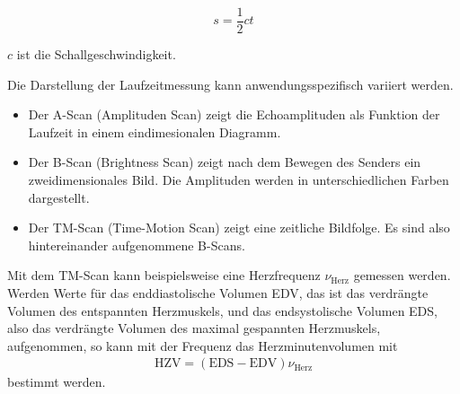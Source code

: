 \begin{equation}
  s = \frac{1}{2} c t
  \label{eqn:SchallStrecke}
\end{equation}

$c$ ist die Schallgeschwindigkeit.

Die Darstellung der Laufzeitmessung kann anwendungsspezifisch variiert werden.

\begin{itemize}
  \item Der A-Scan (Amplituden Scan) zeigt die Echoamplituden als Funktion der
  Laufzeit in einem eindimesionalen Diagramm.

  \item Der B-Scan (Brightness Scan) zeigt nach dem Bewegen des Senders ein
  zweidimensionales Bild. Die Amplituden werden in unterschiedlichen Farben dargestellt.

  \item Der TM-Scan (Time-Motion Scan) zeigt eine zeitliche Bildfolge. Es sind also hintereinander
  aufgenommene B-Scans.
\end{itemize}

Mit dem TM-Scan kann beispielsweise eine Herzfrequenz $\nu_\text{Herz}$ gemessen
werden. Werden Werte für das enddiastolische Volumen EDV, das ist das verdrängte
Volumen des entspannten Herzmuskels, und das endsystolische Volumen EDS, also
das verdrängte Volumen des maximal gespannten Herzmuskels, aufgenommen,
so kann mit der Frequenz das Herzminutenvolumen mit
\begin{align}
  \text{HZV} = (\text{EDS}-\text{EDV}) \nu_\text{Herz}
  \label{eqn:HZV}
\end{align}
bestimmt werden.
